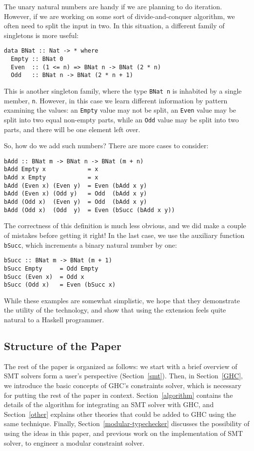 \documentclass{sigplanconf}
\begin{document}
The unary natural numbers are handy if we are planning to
do iteration.  However, if we are working on some sort of
divide-and-conquer algorithm, we often need to split the
input in two.  In this situation, a different family of
singletons is more useful:
\begin{Verbatim}
data BNat :: Nat -> * where
  Empty :: BNat 0
  Even  :: (1 <= n) => BNat n -> BNat (2 * n)
  Odd   :: BNat n -> BNat (2 * n + 1)
\end{Verbatim}
This is another singleton family, where the type \Verb"BNat n"
is inhabited by a single member, \Verb"n".  However, in this
case we learn different information by pattern examining
the values:  an \Verb"Empty" value may not be split,
an \Verb"Even" value may be split into two equal non-empty
parts, while an \Verb"Odd" value may be split into two parts,
and there will be one element left over.

So, how do we add such numbers?  There are more cases to
consider:
\begin{Verbatim}
bAdd :: BNat m -> BNat n -> BNat (m + n)
bAdd Empty x            = x
bAdd x Empty            = x
bAdd (Even x) (Even y)  = Even (bAdd x y)
bAdd (Even x) (Odd y)   = Odd  (bAdd x y)
bAdd (Odd x)  (Even y)  = Odd  (bAdd x y)
bAdd (Odd x)  (Odd  y)  = Even (bSucc (bAdd x y))
\end{Verbatim}
The correctness of this definition is much less obvious,
and we did make a couple of mistakes before getting it
right!  In the last case, we use the auxiliary function
\Verb"bSucc", which increments a binary natural number
by one:
\begin{Verbatim}
bSucc :: BNat m -> BNat (m + 1)
bSucc Empty     = Odd Empty
bSucc (Even x)  = Odd x
bSucc (Odd x)   = Even (bSucc x)
\end{Verbatim}

While these examples are somewhat simplistic, we hope
that they demonstrate the utility of the technology,
and show that using the extension feels quite natural
to a Haskell programmer.


\subsection{Structure of the Paper}

The rest of the paper is organized as follows:
we start with a brief overview of SMT solvers form a user's perspective
(Section~\ref{smt}).  Then, in Section~\ref{GHC}, we introduce the
basic concepts of GHC's constraints
solver, which is necessary for putting the rest of the paper in context.
Section~\ref{algorithm} contains the details of the algorithm for
integrating an SMT solver with GHC, and Section~\ref{other} explains
other theories that could be added to GHC using the same technique.
Finally, Section~\ref{modular-typechecker} discusses the possibility
of using the ideas in this paper, and previous work on the
implementation of SMT solver, to engineer a modular constraint solver.
\end{document}

